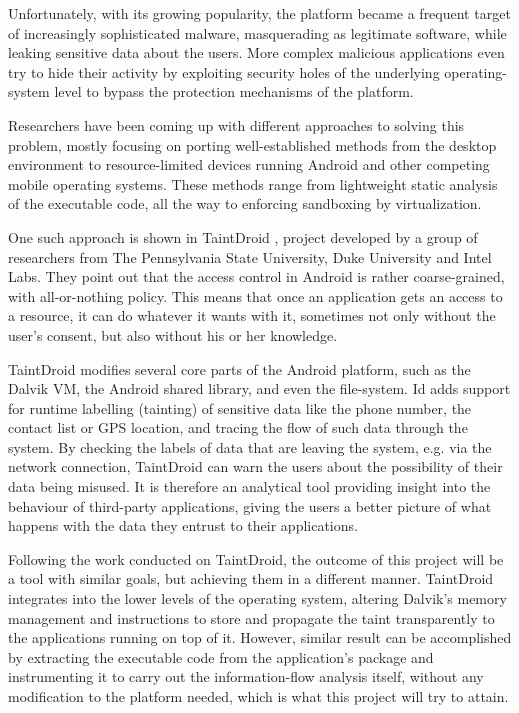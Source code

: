 \documentclass[12pt]{article}
\begin{document}
Unfortunately, with its growing popularity, the platform became a frequent
target of increasingly sophisticated malware, masquerading as legitimate
software, while leaking sensitive data about the users. More complex
malicious applications even try to hide their activity by exploiting 
security holes of the underlying operating-system level to bypass the 
protection mechanisms of the platform.

Researchers have been coming up with different approaches to solving
this problem, mostly focusing on porting well-established methods from
the desktop environment to resource-limited devices running Android and
other competing mobile operating systems. These methods range from 
lightweight static analysis of the executable code, all the way to 
enforcing sandboxing by virtualization. 

One such approach is shown in TaintDroid \cite{www.appanalysis.org}, 
project developed by a group of researchers from The Pennsylvania State
University, Duke University and Intel Labs. They point out that the
access control in Android is rather coarse-grained, with all-or-nothing
policy. This means that once an application gets an access to a resource,
it can do whatever it wants with it, sometimes not only without the 
user's consent, but also without his or her knowledge.

TaintDroid modifies several core parts of the Android platform, such as 
the Dalvik VM, the Android shared library, and even the file-system. 
Id adds support for runtime labelling (tainting) of sensitive data like 
the phone number, the contact list or GPS location, and tracing the flow 
of such data through the system. By checking the labels of data that are
leaving the system, e.g. via the network connection, TaintDroid can warn 
the users about the possibility of their data being misused. It is 
therefore an analytical tool providing insight into the behaviour of 
third-party applications, giving the users a better picture of what 
happens with the data they entrust to their applications.

Following the work conducted on TaintDroid, the outcome of this project 
will be a tool with similar goals, but achieving them in a different 
manner. TaintDroid integrates into the lower levels of the operating 
system, altering Dalvik's memory management and instructions to store and
propagate the taint transparently to the applications running on top of 
it. However, similar result can be accomplished by extracting the 
executable code from the application's package and instrumenting it to 
carry out the information-flow analysis itself, without any modification 
to the platform needed, which is what this project will try to attain.
\end{document}
